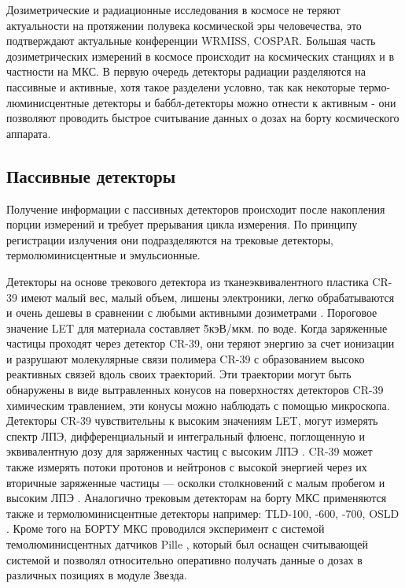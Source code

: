 Дозиметрические и радиационные исследования в космосе не теряют актуальности на протяжении полувека космической эры человечества, это подтверждают актуальные  конференции WRMISS, COSPAR. Большая часть дозиметрических измерений в космосе происходит на космических станциях и в частности на МКС. 
В первую очередь детекторы радиации разделяются на пассивные и активные, хотя такое разделени условно, так как некоторые термо-люминисцентные детекторы и баббл-детекторы можно отнести к активным - они позволяют проводить быстрое считывание данных о дозах на борту космического аппарата. 

\subsection{Пассивные детекторы} \label{subsect1_3_1}

Получение информации с пассивных детекторов происходит после накопления порции измерений и требует прерывания цикла измерения. По принципу регистрации излучения они подразделяются на трековые детекторы, термолюминисцентные \cite{Luszik-Bhadra1999,Kulkarni2011} и эмульсионные. 

Детекторы на основе трекового детектора из  тканеэквивалентного пластика CR-39 имеют малый вес, малый объем, лишены электроники, легко обрабатываются и очень дешевы в сравнении с любыми активными дозиметрами \cite{Zhou2008}. 
Пороговое значение LET для материала составляет \~ 5кэВ/мкм. по воде.
Когда заряженные частицы проходят через детектор CR-39,
они теряют энергию за счет ионизации и разрушают молекулярные связи полимера CR-39 с образованием высоко реактивных связей вдоль своих траекторий. Эти траектории могут быть обнаружены в виде вытравленных конусов на поверхностях детекторов CR-39 химическим травлением, эти конусы можно наблюдать с помощью микроскопа. Детекторы CR-39 чувствительны к высоким значениям LET,
могут измерять спектр ЛПЭ, дифференциальный и интегральный флюенс, поглощенную  и эквивалентную дозу для заряженных частиц с высоким ЛПЭ \cite{Zhou2008}. CR-39 может также измерять потоки протонов и нейтронов с высокой энергией через их вторичные заряженные частицы --- осколки столкновений с малым пробегом и высоким ЛПЭ \cite{Zhou2008}. 
Аналогично трековым детекторам на борту МКС применяются также и термолюминисцентные детекторы например: TLD-100, -600, -700, OSLD  \cite{Zhou2010}. Кроме того на БОРТУ МКС проводился эксперимент с системой темолюминисцентных датчиков Pille \cite{Apathy2007}, который был оснащен считывающей системой и позволял относительно оперативно получать данные о дозах в различных позициях в модуле Звезда.

